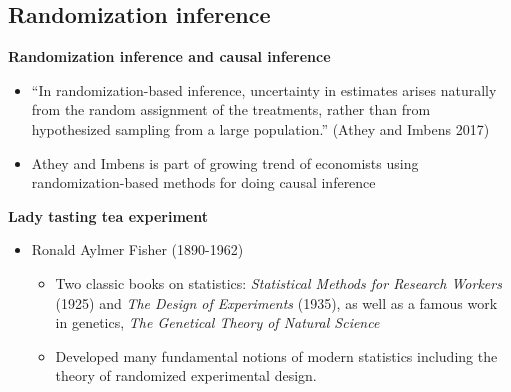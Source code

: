 \documentclass[notes=show]{beamer}
\begin{document}
%	

\subsection{Randomization inference}

\begin{frame}
\begin{center}
\textbf{Randomization inference and causal inference}
\end{center}

\begin{itemize}
\item ``In randomization-based inference, uncertainty in estimates arises naturally from the random assignment of the treatments, rather than from hypothesized sampling from a large population.'' (Athey and Imbens 2017)

\item Athey and Imbens is part of growing trend of economists using randomization-based methods for doing causal inference

\end{itemize}


\end{frame}




\begin{frame}[plain]
	\begin{center}
	\textbf{Lady tasting tea experiment}
	\end{center}

	\begin{itemize}
	\item Ronald Aylmer Fisher (1890-1962)
		\begin{itemize}
		\item Two classic books on statistics: \emph{Statistical Methods for Research Workers} (1925) and \emph{The Design of Experiments} (1935), as well as a famous work in genetics, \emph{The Genetical Theory of Natural Science}
		\item Developed many fundamental notions of modern statistics including the theory of randomized experimental design.
		\end{itemize}

	\end{itemize}
	
\end{frame}
\end{document}
